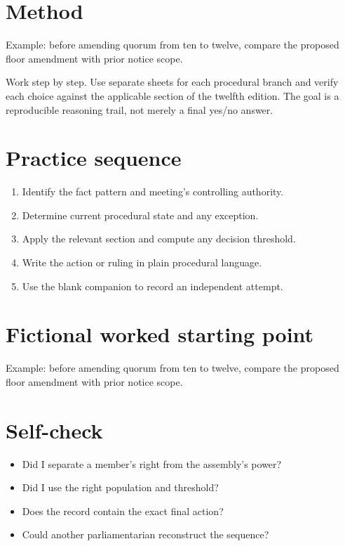 \documentclass[11pt]{article}
\begin{document}
\SuiteOpen
\section{Method}
Example: before amending quorum from ten to twelve, compare the proposed floor amendment with prior notice scope.

Work step by step. Use separate sheets for each procedural branch and verify each choice against the applicable section of the twelfth edition. The goal is a reproducible reasoning trail, not merely a final yes/no answer.

\section{Practice sequence}
\begin{enumerate}[leftmargin=*,itemsep=4pt]
\item Identify the fact pattern and meeting’s controlling authority.
\item Determine current procedural state and any exception.
\item Apply the relevant section and compute any decision threshold.
\item Write the action or ruling in plain procedural language.
\item Use the blank companion to record an independent attempt.
\end{enumerate}

\section{Fictional worked starting point}
Example: before amending quorum from ten to twelve, compare the proposed floor amendment with prior notice scope.

\section{Self-check}
\begin{itemize}[leftmargin=*,itemsep=4pt]
\item Did I separate a member’s right from the assembly’s power?
\item Did I use the right population and threshold?
\item Does the record contain the exact final action?
\item Could another parliamentarian reconstruct the sequence?
\end{itemize}
\end{document}
